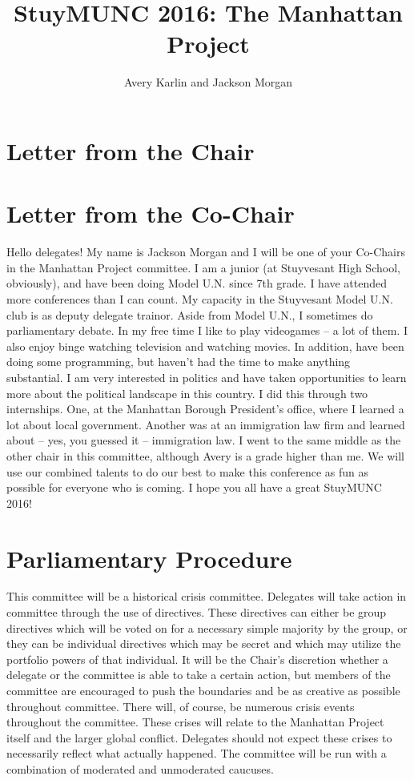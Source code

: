 \documentclass[11 pt, twoside]{article}
\begin{document}
\title{StuyMUNC 2016: The Manhattan Project}
\author{Avery Karlin and Jackson Morgan}
\date{}

\maketitle
\newpage
\tableofcontents
\vspace{11pt}
\newpage

\section{Letter from the Chair}

\section{Letter from the Co-Chair}
	Hello delegates! My name is Jackson Morgan and I will be one of your Co-Chairs in the Manhattan Project committee. I am a junior (at Stuyvesant High School, obviously), and have been doing Model U.N. since 7th grade. I have attended more conferences than I can count. My capacity in the Stuyvesant Model U.N. club is as deputy delegate trainor. Aside from Model U.N., I sometimes do parliamentary debate. In my free time I like to play videogames -- a lot of them. I also enjoy binge watching television and watching movies. In addition, have been doing some programming, but haven’t had the time to make anything substantial.
	I am very interested in politics and have taken opportunities to learn more about the political landscape in this country. I did this through two internships. One, at the Manhattan Borough President’s office, where I learned a lot about local government. Another was at an immigration law firm and learned about -- yes, you guessed it -- immigration law. 	
	I went to the same middle as the other chair in this committee, although Avery is a grade higher than me. We will use our combined talents to do our best to make this conference as fun as possible for everyone who is coming. I hope you all have a great StuyMUNC 2016!

\section{Parliamentary Procedure}
	This committee will be a historical crisis committee. Delegates will take action in committee through the use of directives. These directives can either be group directives which will be voted on for a necessary simple majority by the group, or they can be individual directives which may be secret and which may utilize the portfolio powers of that individual. It will be the Chair’s discretion whether a delegate or the committee is able to take a certain action, but members of the committee are encouraged to push the boundaries and be as creative as possible throughout committee. There will, of course, be numerous crisis events throughout the committee. These crises will relate to the Manhattan Project itself and the larger global conflict. Delegates should not expect these crises to necessarily reflect what actually happened. The committee will be run with a combination of moderated and unmoderated caucuses.
\end{document}
